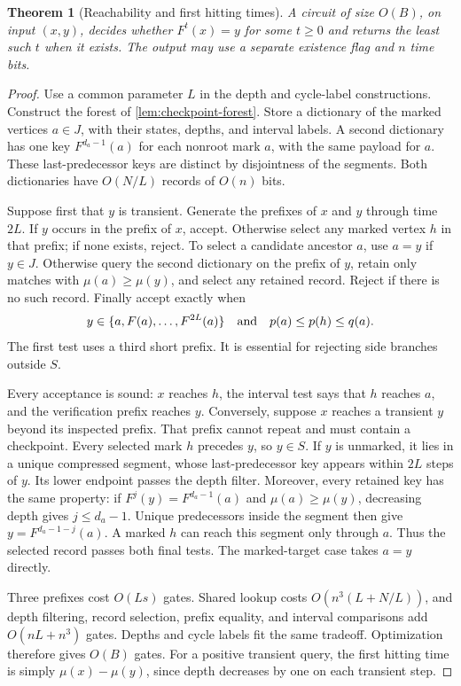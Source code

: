 \documentclass[11pt]{article}
\newtheorem{theorem}{Theorem}[section]
\theoremstyle{definition}
\theoremstyle{remark}
\numberwithin{equation}{section}
\begin{document}
\begin{theorem}[Reachability and first hitting times]\label{thm:reachability}
A circuit of size $O(B)$, on input $(x,y)$, decides whether
$F^t(x)=y$ for some $t\geq0$ and returns the least such $t$ when it exists.
The output may use a separate existence flag and $n$ time bits.
\end{theorem}
\begin{proof}
Use a common parameter $L$ in the depth and cycle-label constructions.
Construct the forest of \cref{lem:checkpoint-forest}.
Store a dictionary of the marked vertices $a\in J$, with their states,
depths, and interval labels.  A second dictionary has one key
$F^{d_a-1}(a)$ for each nonroot mark $a$, with the same payload for $a$.
These last-predecessor keys are distinct by disjointness of the segments.
Both dictionaries have $O(N/L)$ records of $O(n)$ bits.

Suppose first that $y$ is transient.  Generate the prefixes of $x$ and
$y$ through time $2L$.  If $y$ occurs in the prefix of $x$, accept.
Otherwise select any marked vertex $h$ in that prefix; if none exists,
reject.  To select a candidate ancestor $a$, use $a=y$ if $y\in J$.
Otherwise query the second dictionary on the prefix of $y$, retain only
matches with $\mu(a)\geq\mu(y)$, and select any retained record.  Reject
if there is no such record.  Finally accept exactly when
\[
 y\in\{a,F(a),\ldots,F^{2L}(a)\}
 \quad\hbox{and}\quad p(a)\leq p(h)\leq q(a).
\]
The first test uses a third short prefix.  It is essential for rejecting
side branches outside $S$.

Every acceptance is sound: $x$ reaches $h$, the interval test says that
$h$ reaches $a$, and the verification prefix reaches $y$.  Conversely,
suppose $x$ reaches a transient $y$ beyond its inspected prefix.
That prefix cannot repeat and must contain a checkpoint.  Every selected
mark $h$ precedes $y$, so $y\in S$.  If $y$ is unmarked, it lies in a
unique compressed segment, whose last-predecessor key appears within
$2L$ steps of $y$.  Its lower endpoint passes the depth filter.
Moreover, every retained key has the same property: if
$F^j(y)=F^{d_a-1}(a)$ and $\mu(a)\geq\mu(y)$, decreasing depth gives
$j\leq d_a-1$.  Unique predecessors inside the segment then give
$y=F^{d_a-1-j}(a)$.  A marked $h$ can reach this segment only through
$a$.  Thus the selected record passes both final tests.  The marked-target
case takes $a=y$ directly.

Three prefixes cost $O(Ls)$ gates.  Shared lookup costs
$O(n^3(L+N/L))$, and depth filtering, record selection, prefix equality,
and interval comparisons add $O(nL+n^3)$ gates.  Depths and cycle labels
fit the same tradeoff.  Optimization therefore gives $O(B)$ gates.
For a positive transient query, the first hitting time is simply
$\mu(x)-\mu(y)$, since depth decreases by one on each transient step.


\end{proof}
\end{document}
